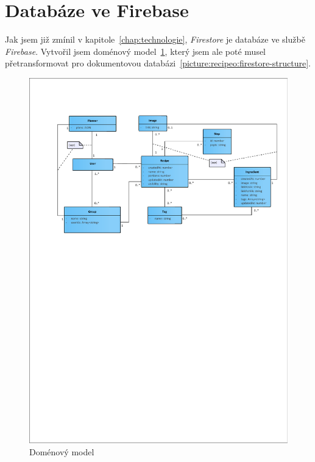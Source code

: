 \section{Databáze ve Firebase}
Jak jsem již zmínil v kapitole~\ref{chap:technologie}, \emph{Firestore} je databáze ve službě \emph{Firebase}. Vytvořil jsem doménový model~\ref{picture:recipeo:domain-model}, který jsem ale poté musel přetransformovat pro
dokumentovou databázi~\ref{picture:recipeo:firestore-structure}.
\begin{figure}[h]
    \includegraphics[width=\textwidth]{pdf/domain-model}
    \caption{Doménový model} \label{picture:recipeo:domain-model}
\end{figure}

